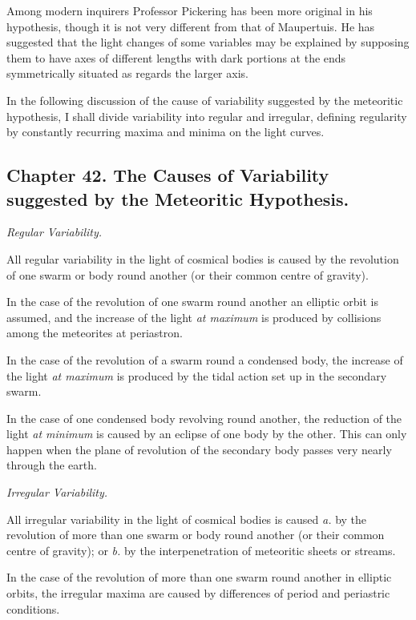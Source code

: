 \documentclass[a4paper, 12pt, oneside, polutonikogreek, english]{article}
\begin{document}
Among modern inquirers Professor Pickering has been more original in his hypothesis, though it is not very different from that of Maupertuis. He has suggested that the light changes of some variables may be explained by supposing them to have axes of different lengths with dark portions at the ends symmetrically situated as regards the larger axis.

In the following discussion of the cause of variability suggested by the meteoritic hypothesis, I shall divide variability into regular and irregular, defining regularity by constantly recurring maxima and minima on the light curves.

\subsection{Chapter 42. The Causes of Variability suggested by the Meteoritic Hypothesis.}

\emph{Regular Variability.}

All regular variability in the light of cosmical bodies is caused by the revolution of one swarm or body round another (or their common centre of gravity).

In the case of the revolution of one swarm round another an elliptic orbit is assumed, and the increase of the light \emph{at maximum} is produced by collisions among the meteorites at periastron.

In the case of the revolution of a swarm round a condensed body, the increase of the light \emph{at maximum} is produced by the tidal action set up in the secondary swarm.

In the case of one condensed body revolving round another, the reduction of the light \emph{at minimum} is caused by an eclipse of one body by the other. This can only happen when the plane of revolution of the secondary body passes very nearly through the earth.

\emph{Irregular Variability.}

All irregular variability in the light of cosmical bodies is caused \emph{a.} by the revolution of more than one swarm or body round another (or their common centre of gravity); or \emph{b.} by the interpenetration of meteoritic sheets or streams.

In the case of the revolution of more than one swarm round another in elliptic orbits, the irregular maxima are caused by differences of period and periastric conditions.
\end{document}
